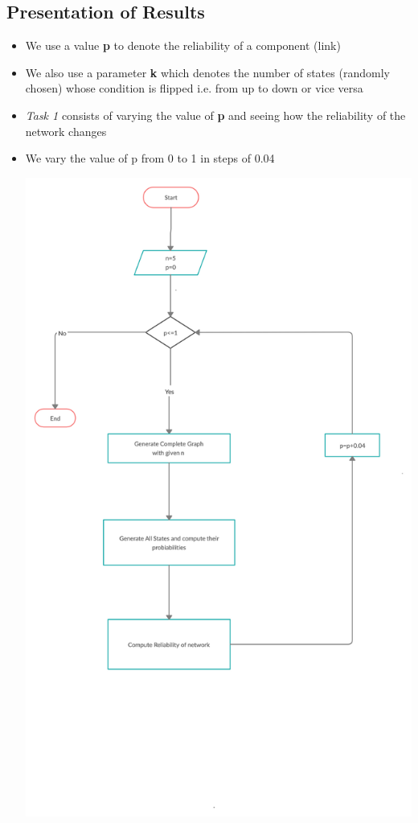 \documentclass[12pt,letterpaper,titlepage,en-US]{article}
\begin{document}
\subsection{Presentation of Results}
\begin{itemize}

\item We use a value \textbf{p} to denote the reliability of a component (link) 

\item We also use a parameter \textbf{k} which denotes the number of states (randomly chosen) whose condition is flipped i.e. from up to down or vice versa

\item \textit{Task 1} consists of varying the value of \textbf{p} and seeing how the reliability of the network changes

\item We vary the value of p  from 0 to 1 in steps of 0.04  

 \includegraphics[scale=0.20]{fig/task1.png}
 

\end{itemize}
\end{document}
